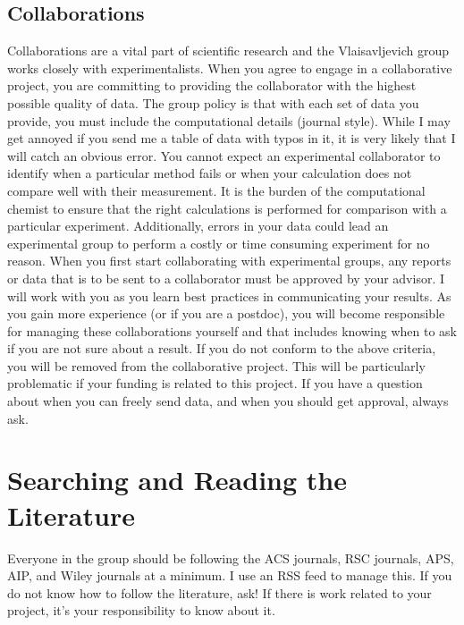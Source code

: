 \documentclass[letterpaper]{article}
\begin{document}
\subsection*{Collaborations}
Collaborations are a vital part of scientific research and the Vlaisavljevich group works closely with experimentalists. When you agree to engage in a collaborative project, you are committing to providing the collaborator with the highest possible quality of data. The group policy is that with each set of data you provide, you must include the computational details (journal style). While I may get annoyed if you send me a table of data with typos in it, it is very likely that I will catch an obvious error. You cannot expect an experimental collaborator to identify when a particular method fails or when your calculation does not compare well with their measurement. It is the burden of the computational chemist to ensure that the right calculations is performed for comparison with a particular experiment. Additionally, errors in your data could lead an experimental group to perform a costly or time consuming experiment for no reason. When you first start collaborating with experimental groups, any reports or data that is to be sent to a collaborator must be approved by your advisor. I will work with you as you learn best practices in communicating your results. As you gain more experience (or if you are a postdoc), you will become responsible for managing these collaborations yourself and that includes knowing when to ask if you are not sure about a result. If you do not conform to the above criteria, you will be removed from the collaborative project. This will be particularly problematic if your funding is related to this project. If you have a question about when you can freely send data, and when you should get approval, always ask.


%

\section*{Searching and Reading the Literature}
Everyone in the group should be following the ACS journals, RSC journals, APS, AIP, and Wiley journals at a minimum. I use an RSS feed to manage this. If you do not know how to follow the literature, ask! If there is work related to your project, it's your responsibility to know about it.

\end{document}
